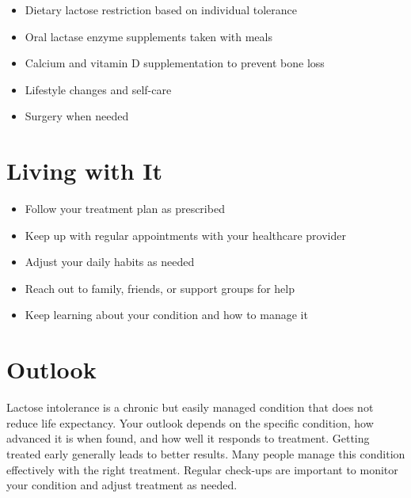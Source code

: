 \begin{itemize}[noitemsep]
  \item Dietary lactose restriction based on individual tolerance
  \item Oral lactase enzyme supplements taken with meals
  \item Calcium and vitamin D supplementation to prevent bone loss
  \item Lifestyle changes and self-care
  \item Surgery when needed
\end{itemize}

\section{Living with It}

\begin{itemize}[noitemsep]
  \item Follow your treatment plan as prescribed
  \item Keep up with regular appointments with your healthcare provider
  \item Adjust your daily habits as needed
  \item Reach out to family, friends, or support groups for help
  \item Keep learning about your condition and how to manage it
\end{itemize}

\section{Outlook}
Lactose intolerance is a chronic but easily managed condition that does not reduce life expectancy. Your outlook depends on the specific condition, how advanced it is when found, and how well it responds to treatment. Getting treated early generally leads to better results. Many people manage this condition effectively with the right treatment. Regular check-ups are important to monitor your condition and adjust treatment as needed.
